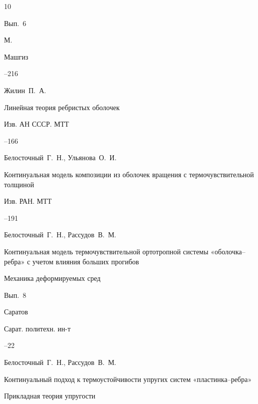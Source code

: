 \begin{thebibliography}{10}

\volinfo Вып.~6

\publaddr М.

\publ Машгиз

--216




\by Жилин~П.~А.

\paper Линейная теория ребристых оболочек

\jour Изв. АН СССР. МТТ



--166



 




\by Белосточный~Г.~Н., Ульянова~О.~И.

\paper Континуальная модель композиции из оболочек вращения с термочувствительной толщиной

\jour Изв. РАН. МТТ



--191




 


 \by Белосточный~Г.~Н., Рассудов~В.~М.

 \paper Континуальная модель термочувствительной ортотропной системы «оболочка–ребра» с учетом влияния больших прогибов

 \inbook Механика деформируемых сред


\volinfo Вып.~8

\publaddr Саратов

\publ  Сарат. политехн. ин-т

 --22



  


\by Белосточный~Г.~Н., Рассудов~В.~М.

\paper Континуальный подход к термоустойчивости упругих систем «пластинка–ребра» 

\inbook Прикладная теория упругости


\end{thebibliography}
